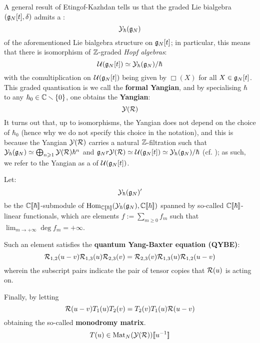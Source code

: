         A general result of Etingof-Kazhdan tells us that the graded Lie bialgebra $(\mathfrak{g}_N[t], \delta)$ admits a :
            $$\mathcal{Y}_{\hbar}(\mathfrak{g}_N)$$
        of the aforementioned Lie bialgebra structure on $\mathfrak{g}_N[t]$; in particular, this means that there is isomorphism of $\mathbb{Z}$-graded \textit{Hopf algebras}:
            $$\mathcal{U}(\mathfrak{g}_N[t]) \simeq \mathcal{Y}_{\hbar}(\mathfrak{g}_N)/\hbar$$
        with the comultiplication on $\mathcal{U}(\mathfrak{g}_N[t])$ being given by $\Box(X)$ for all $X \in \mathfrak{g}_N[t]$. This graded quantisation is we call the \textbf{formal Yangian}, and by specialising $\hbar$ to any $\hbar_0 \in \mathbb{C} \smallsetminus \{0\}$, one obtains the \textbf{Yangian}:
            $$\mathcal{Y}(\mathcal{R})$$
        It turns out that, up to isomorphisms, the Yangian does not depend on the choice of $\hbar_0$ (hence why we do not specify this choice in the notation), and this is because the Yangian $\mathcal{Y}(\mathcal{R})$ carries a natural $\mathbb{Z}$-filtration such that $\mathcal{Y}_{\hbar}(\mathfrak{g}_N) \simeq \bigoplus_{n \geqslant 1} \mathcal{Y}(\mathcal{R}) \hbar^n$ and $\mathfrak{g}_Nr \mathcal{Y}(\mathcal{R}) \simeq \mathcal{U}(\mathfrak{g}_N[t]) \simeq \mathcal{Y}_{\hbar}(\mathfrak{g}_N)/\hbar$ (cf. \cite{drinfeld_original_yangian_paper}); as such, we refer to the Yangian as a  of $\mathcal{U}(\mathfrak{g}_N[t])$.
    
        Let:
            $$\mathcal{Y}_{\hbar}(\mathfrak{g}_N)'$$
        be the $\mathbb{C}[\![\hbar]\!]$-submodule of $\operatorname{Hom}_{\mathbb{C}[\![\hbar]\!]}( \mathcal{Y}_{\hbar}(\mathfrak{g}_N), \mathbb{C}[\![\hbar]\!] )$ spanned by so-called  $\mathbb{C}[\![\hbar]\!]$-linear functionals, which are elements $f := \sum_{m \geq 0} f_m$ such that $\lim_{m \to +\infty} \deg f_m = +\infty$.
            
        Such an element satisfies the \textbf{quantum Yang-Baxter equation (QYBE)}:
            \begin{equation} \label{equation: additive_spectral_QYBE}
                \mathcal{R}_{1, 2}(u - v) \mathcal{R}_{1, 3}(u) \mathcal{R}_{2, 3}(v) = \mathcal{R}_{2, 3}(v) \mathcal{R}_{1, 3}(u) \mathcal{R}_{1, 2}(u - v)
            \end{equation}
        wherein the subscript pairs indicate the pair of tensor copies that $\mathcal{R}(u)$ is acting on.
    
        Finally, by letting 
            \begin{equation} \label{equation: spectral_RTT_relation}
                \mathcal{R}(u - v) T_1(u) T_2(v) = T_2(v) T_1(u) \mathcal{R}(u - v)
            \end{equation}
        obtaining the so-called \textbf{monodromy matrix}.
            $$T(u) \in \operatorname{Mat}_N( \mathcal{Y}(\mathcal{R}) )[\![u^{-1}]\!]$$
    
